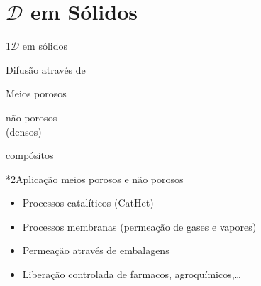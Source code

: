 \documentclass[\mainfilename]{subfiles}
\begin{document}
    
    

\part*{\(\mathscr{D}\) em Sólidos}

\begin{sectionBox}1{\(\mathscr{D}\) em sólidos} %
    
    Difusão através de
    \begin{itemize}
        \begin{multicols}{3}
            \item Meios porosos
            \item não porosos\\(densos)
            \item compósitos
        \end{multicols}
    \end{itemize}

    \begin{sectionBox}*2{Aplicação meios porosos e não porosos} %
        \begin{itemize}
            \item Processos catalíticos (CatHet)
            \item Processos membranas (permeação de gases e vapores)
            \item Permeação através de embalagens
            \item Liberação controlada de farmacos, agroquímicos,\dots
        \end{itemize}
    \end{sectionBox}
    
\end{sectionBox}
\end{document}
